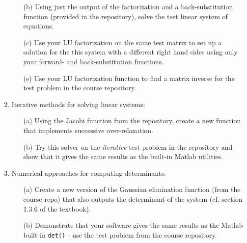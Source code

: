 \documentclass{article}
\begin{document}
\begin{enumerate}
\begin{itemize}
    \item[(b)] Using just the output of the factorization and a back-substitution function (provided in the repository), solve the test linear system of equations.  
    \item[(c)] Use your LU factorization on the same test matrix to set up a solution for the this system with a different right hand sides using only your forward- and back-substitution functions.
    \item[(e)] Use your LU factorization function to find a matrix inverse for the test problem in the course repository.  
  \end{itemize}
  \item Iterative methods for solving linear systems:  
  \begin{itemize}
    \item[(a)] Using the Jacobi function from the repository, create a new function that implements successive over-relaxation.  
    \item[(b)] Try this solver on the \emph{iterative} test problem in the repository and show that it gives the same results as the built-in Matlab utilities. 
  \end{itemize}  
  \item Numerical approaches for computing determinants:  
  \begin{itemize}
    \item[(a)] Create a new version of the Gaussian elimination function (from the course repo) that also outputs the determinant of the system (cf. section 1.3.6 of the textbook).  
    \item[(b)] Demonstrate that your software gives the same results as the Matlab built-in \texttt{det()} - use the test problem from the course repository.  
    
  \end{itemize}
\end{enumerate}
\end{document}
